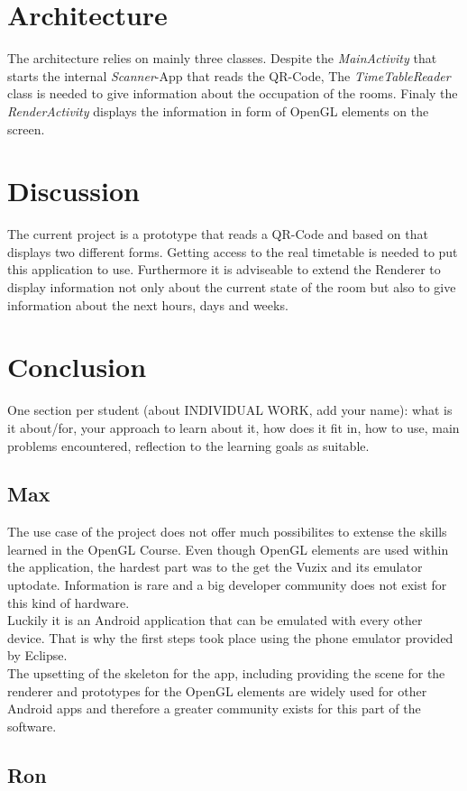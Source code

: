 \documentclass[]{article}
\begin{document}
\section{Architecture}
The architecture relies on mainly three classes. Despite the \emph{MainActivity} that starts the internal \emph{Scanner}-App that reads the QR-Code, The \emph{TimeTableReader} class is needed to give information about the occupation of the rooms. Finaly the \emph{RenderActivity} displays the information in form of OpenGL elements on the screen.   
\section{Discussion}
The current project is a prototype that reads a QR-Code and based on that displays two different forms. Getting access to the real timetable is needed to put this application to use. Furthermore it is adviseable to extend the Renderer to display information not only about the current state of the room but also to give information about the next hours, days and weeks.  
\section{Conclusion}
One section per student (about INDIVIDUAL WORK, add your name): what is it about/for,
your approach to learn about it, how does it fit in, how to use, main problems encountered,
reflection to the learning goals as suitable.
\subsection{Max}
The use case of the project does not offer much possibilites to extense the skills learned in the OpenGL Course. Even though OpenGL elements are used within the application, the hardest part was to the get the Vuzix and its emulator uptodate. Information is rare and a big developer community does not exist for this kind of hardware. \\
Luckily it is an Android application that can be emulated with every other device. That is why the first steps took place using the phone emulator provided by Eclipse. \\
The upsetting of the skeleton for the app, including providing the scene for the renderer and prototypes for the OpenGL elements are widely used for other Android apps and therefore a greater community exists for this part of the software. 
\subsection{Ron}
\end{document}
